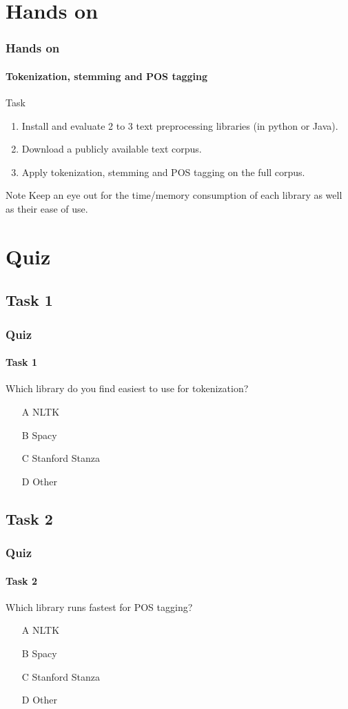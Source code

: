 \documentclass{beamer}
\begin{document}
\section{Hands on}
\begin{frame}
    \frametitle{Hands on}
    \framesubtitle{Tokenization, stemming and POS tagging}
    \begin{block}{Task}
        \begin{enumerate}
            \item Install and evaluate 2 to 3 text preprocessing libraries (in python or Java).
            \item Download a publicly available text corpus.
            \item Apply tokenization, stemming and POS tagging on the full corpus.
        \end{enumerate}
    \end{block}
    \begin{block}{Note}
        \scriptsize
        Keep an eye out for the time/memory consumption of each library as well as their ease of use.     
    \end{block}
\end{frame}

\section{Quiz}
\subsection{Task 1}
\begin{frame}
    \frametitle{Quiz}
    \framesubtitle{Task 1}
    Which library do you find easiest to use for tokenization?
    \begin{enumerate}
        \item[A] NLTK
        \item[B] Spacy
        \item[C] Stanford Stanza
        \item[D] Other
    \end{enumerate}
\end{frame}

\subsection{Task 2}
\begin{frame}
    \frametitle{Quiz}
    \framesubtitle{Task 2}
    Which library runs fastest for POS tagging?
    \begin{enumerate}
        \item[A] NLTK
        \item[B] Spacy
        \item[C] Stanford Stanza
        \item[D] Other
    \end{enumerate}
\end{frame}
\end{document}
